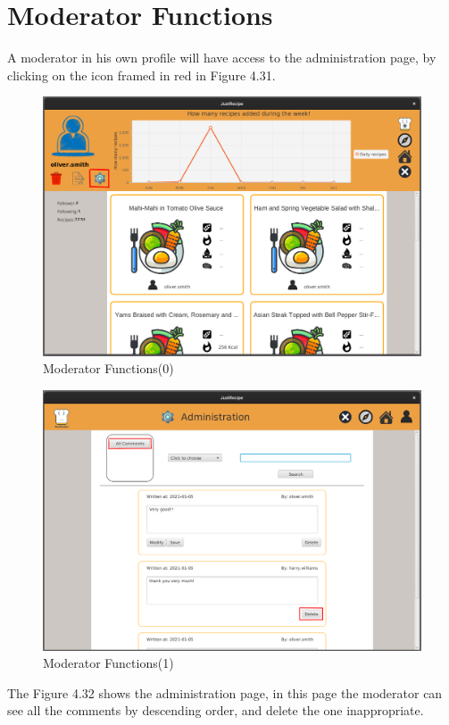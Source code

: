 \documentclass[a4paper]{report}
\begin{document}
\section{Moderator Functions}
A moderator in his own profile will have access to the administration page, by clicking on the icon framed in red in Figure 4.31.
\begin{figure}[htpb]
	\centering
	\includegraphics[scale=0.37]{img/user_manual/moderatorFunction0.png}
	\caption{Moderator Functions(0)}
\end{figure}
\begin{figure}[htpb]
	\centering
	\includegraphics[scale=0.37]{img/user_manual/moderatorFunction1.png}
	\caption{Moderator Functions(1)}
\end{figure}

\noindent The Figure 4.32 shows the administration page, in this page the moderator can see all the comments by descending order, and delete the one inappropriate.
\end{document}
